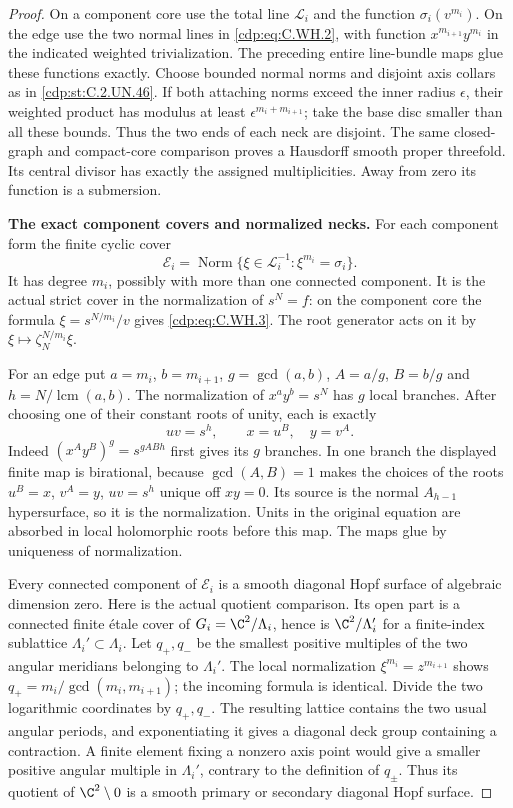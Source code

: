 \begin{proof}
On a component core use the total line
$\mathcal L_i$ and the function
$\sigma_i(v^{m_i})$. On the edge use the
two normal lines in \eqref{cdp:eq:C.WH.2}, with function
$x^{m_{i+1}}y^{m_i}$ in the indicated
weighted trivialization. The preceding
entire line-bundle maps glue these
functions exactly. Choose bounded normal
norms and disjoint axis collars as in
\ref{cdp:st:C.2.UN.46}. If both attaching norms exceed
the inner radius $\epsilon$, their
weighted product has modulus at least
$\epsilon^{m_i+m_{i+1}}$; take the base
disc smaller than all these bounds.
Thus the two ends of each neck are
disjoint. The same closed-graph and
compact-core comparison proves a
Hausdorff smooth proper threefold.
Its central divisor has exactly the
assigned multiplicities. Away from
zero its function is a submersion.

\par\medskip\noindent\textbf{The exact component covers and normalized necks.}
For each component form the finite cyclic
cover
\[
 \mathcal E_i=
 \operatorname{Norm}
 \{\xi\in\mathcal L_i^{-1}:
                         \xi^{m_i}=\sigma_i\}.
\tag{C.WH.3}\label{cdp:eq:C.WH.3}
\]
It has degree $m_i$, possibly with more
than one connected component. It is
the actual strict cover in the
normalization of $s^N=f$:
on the component core the formula
$\xi=s^{N/m_i}/v$ gives \eqref{cdp:eq:C.WH.3}.
The root generator acts on it by
$\xi\mapsto\zeta_N^{N/m_i}\xi$.

For an edge put $a=m_i$, $b=m_{i+1}$,
$g=\gcd(a,b)$, $A=a/g$, $B=b/g$ and
$h=N/\operatorname{lcm}(a,b)$.
The normalization of $x^a y^b=s^N$
has $g$ local branches. After choosing
one of their constant roots of unity,
each is exactly
\[
      uv=s^h,\qquad x=u^B,\quad y=v^A.
\tag{C.WH.4}\label{cdp:eq:C.WH.4}
\]
Indeed $(x^Ay^B)^g=s^{gABh}$ first
gives its $g$ branches. In one branch
the displayed finite map is
birational, because $\gcd(A,B)=1$
makes the choices of the roots
$u^B=x$, $v^A=y$, $uv=s^h$ unique
off $xy=0$. Its source is the normal
$A_{h-1}$ hypersurface, so it is the
normalization. Units in the original
equation are absorbed in local
holomorphic roots before this map.
The maps glue by uniqueness of
normalization.

Every connected component of
$\mathcal E_i$ is a smooth diagonal
Hopf surface of algebraic dimension
zero. Here is the actual quotient
comparison. Its open part is a
connected finite \'{e}tale cover of
$G_i=\C^2/\Lambda_i$, hence is
$\C^2/\Lambda_i'$ for a finite-index
sublattice $\Lambda_i'\subset\Lambda_i$.
Let $q_+,q_-$ be the smallest positive
multiples of the two angular meridians
belonging to $\Lambda_i'$.
The local normalization
$\xi^{m_i}=z^{m_{i+1}}$ shows
$q_+=m_i/\gcd(m_i,m_{i+1})$;
the incoming formula is identical.
Divide the two logarithmic coordinates
by $q_+,q_-$. The resulting lattice
contains the two usual angular periods,
and exponentiating it gives a diagonal
deck group containing a contraction.
A finite element fixing a nonzero axis
point would give a smaller positive
angular multiple in $\Lambda_i'$,
contrary to the definition of $q_\pm$.
Thus its quotient of $\C^2\setminus0$
is a smooth primary or secondary
diagonal Hopf surface.


\end{proof}
